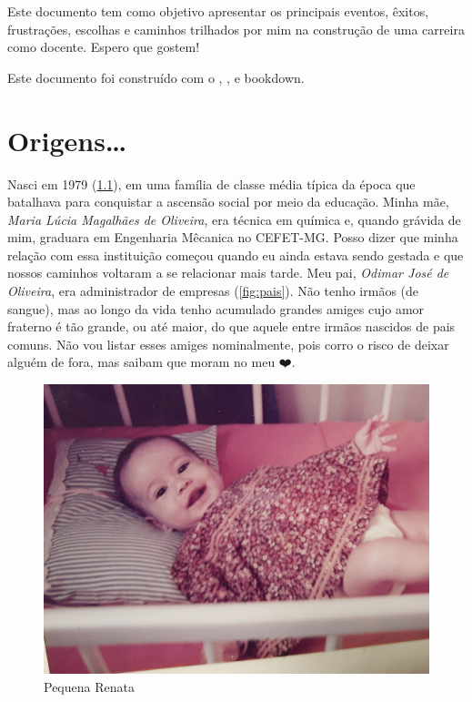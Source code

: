 \documentclass[
]{book}
\begin{document}
Este documento tem como objetivo apresentar os principais eventos,
êxitos, frustrações, escolhas e caminhos trilhados por mim na construção
de uma carreira como docente. Espero que gostem!

Este documento foi construído com o
,
, e
bookdown.

\hypertarget{origens}{%
\chapter{Origens\ldots{}}\label{origens}}

Nasci em 1979 (\ref{fig:reta-baby-1}), em uma família de classe média típica da época que batalhava para conquistar a ascensão social por meio da educação. Minha mãe, \emph{Maria Lúcia Magalhães de Oliveira}, era técnica em química e, quando grávida de mim, graduara em Engenharia Mêcanica no CEFET-MG. Posso dizer que minha relação com essa instituição começou quando eu ainda estava sendo gestada e que nossos caminhos voltaram a se relacionar mais tarde. Meu pai, \emph{Odimar José de Oliveira}, era administrador de empresas (\ref{fig:pais}). Não tenho irmãos (de sangue), mas ao longo da vida tenho acumulado grandes amiges cujo amor fraterno é tão grande, ou até maior, do que aquele entre irmãos nascidos de pais comuns. Não vou listar esses amiges nominalmente, pois corro o risco de deixar alguém de fora, mas saibam que moram no meu ❤️.

\begin{figure}
\centering
\includegraphics{img/reta_baby_1.jpg}
\caption{\label{fig:reta-baby-1}Pequena Renata}
\end{figure}
\end{document}
